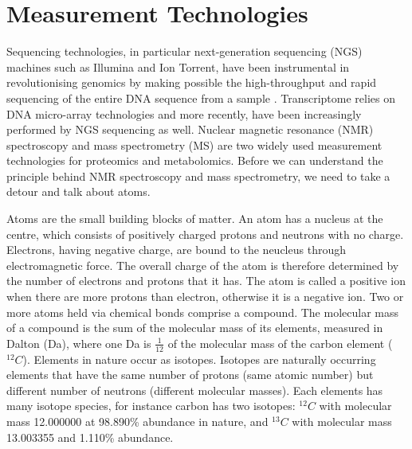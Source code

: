 \section{Measurement Technologies\label{sub:mass-spec}}

Sequencing technologies, in particular next-generation sequencing (NGS) machines such as Illumina and Ion Torrent, have been instrumental in revolutionising genomics by making possible the high-throughput and rapid sequencing of the entire DNA sequence from a sample \cite{metzker2010sequencing}. Transcriptome relies on DNA micro-array technologies and more recently, have been increasingly performed by NGS sequencing as well. Nuclear magnetic resonance (NMR) spectroscopy and mass spectrometry (MS) are two widely used measurement technologies for proteomics and metabolomics. Before we can understand the principle behind NMR spectroscopy and mass spectrometry, we need to take a detour and talk about atoms.

Atoms are the small building blocks of matter. An atom has a nucleus at the centre, which consists of positively charged protons and neutrons with no charge. Electrons, having negative charge, are bound to the neucleus through electromagnetic force. The overall charge of the atom is therefore determined by the number of electrons and protons that it has. The atom is called a positive ion when there are more protons than electron, otherwise it is a negative ion. Two or more atoms held via chemical bonds comprise a compound. The molecular mass of a compound is the sum of the molecular mass of its elements, measured in Dalton (Da), where one Da is $\frac{1}{12}$ of the molecular mass of the carbon element ($^{12}C$). Elements in nature occur as isotopes. Isotopes are naturally occurring elements that have the same number of protons (same atomic number) but different number of neutrons (different molecular masses). Each elements has many isotope species, for instance carbon has two isotopes: $^{12}C$ with molecular mass 12.000000 at 98.890\% abundance in nature, and $^{13}C$ with molecular mass 13.003355 and 1.110\% abundance. %

